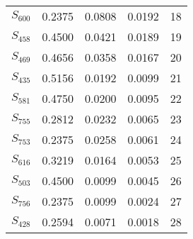 \begin{xltabular}{\textwidth}{XPPPP}
  $S_{600}$ & 0.2375 & 0.0808 & 0.0192 & 18 \\ 
  $S_{458}$ & 0.4500 & 0.0421 & 0.0189 & 19 \\ 
  $S_{469}$ & 0.4656 & 0.0358 & 0.0167 & 20 \\ 
  $S_{435}$ & 0.5156 & 0.0192 & 0.0099 & 21 \\ 
  $S_{581}$ & 0.4750 & 0.0200 & 0.0095 & 22 \\ 
  $S_{755}$ & 0.2812 & 0.0232 & 0.0065 & 23 \\ 
  $S_{753}$ & 0.2375 & 0.0258 & 0.0061 & 24 \\ 
  $S_{616}$ & 0.3219 & 0.0164 & 0.0053 & 25 \\ 
  $S_{503}$ & 0.4500 & 0.0099 & 0.0045 & 26 \\ 
  $S_{756}$ & 0.2375 & 0.0099 & 0.0024 & 27 \\ 
  $S_{428}$ & 0.2594 & 0.0071 & 0.0018 & 28 \\
        \bottomrule
    \end{xltabular}
    